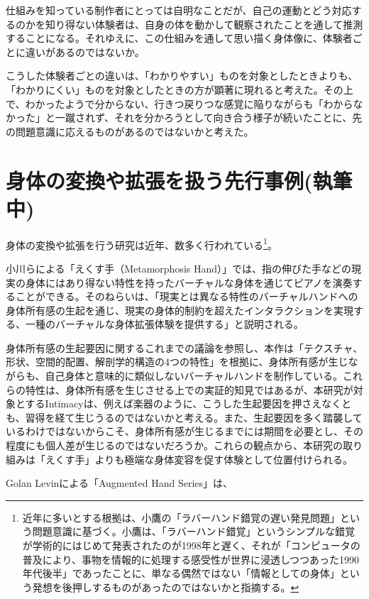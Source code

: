 仕組みを知っている制作者にとっては自明なことだが、自己の運動とどう対応するのかを知り得ない体験者は、自身の体を動かして観察されたことを通して推測することになる。それゆえに、この仕組みを通して思い描く身体像に、体験者ごとに違いがあるのではないか。

こうした体験者ごとの違いは、「わかりやすい」ものを対象としたときよりも、「わかりにくい」ものを対象としたときの方が顕著に現れると考えた。その上で、わかったようで分からない、行きつ戻りつな感覚に陥りながらも「わからなかった」と一蹴されず、それを分かろうとして向き合う様子が続いたことに、先の問題意識に応えるものがあるのではないかと考えた。

\section{身体の変換や拡張を扱う先行事例(執筆中)}
身体の変換や拡張を行う研究は近年、数多く行われている\footnote{近年に多いとする根拠は、小鷹の「ラバーハンド錯覚の遅い発見問題」という問題意識に基づく。小鷹は、「ラバーハンド錯覚」というシンプルな錯覚が学術的にはじめて発表されたのが1998年と遅く、それが「コンピュータの普及により、事物を情報的に処理する感受性が世界に浸透しつつあった1990年代後半」であったことに、単なる偶然ではない「情報としての身体」という発想を後押しするものがあったのではないかと指摘する\cite{kodaka}。}\cite{Kondo2020, ekusute,Kasahara2017,augmented_hand_series}。

小川らによる「えくす手（Metamorphosis Hand）」\cite{ekusute}では、指の伸びた手などの現実の身体にはあり得ない特性を持ったバーチャルな身体を通じてピアノを演奏することができる。そのねらいは、「現実とは異なる特性のバーチャルハンドへの身体所有感の生起を通じ、現実の身体的制約を超えたインタラクションを実現する、一種のバーチャルな身体拡張体験を提供する」と説明される。

身体所有感の生起要因に関するこれまでの議論を参照し、本作は「テクスチャ、形状、空間的配置、解剖学的構造の4つの特性」を根拠に、身体所有感が生じながらも、自己身体と意味的に類似しないバーチャルハンドを制作している。これらの特性は、身体所有感を生じさせる上での実証的知見ではあるが、本研究が対象とするIntimacyは、例えば楽器のように、こうした生起要因を押さえなくとも、習得を経て生じうるのではないかと考える。また、生起要因を多く踏襲しているわけではないからこそ、身体所有感が生じるまでには期間を必要とし、その程度にも個人差が生じるのではないだろうか。これらの観点から、本研究の取り組みは「えくす手」よりも極端な身体変容を促す体験として位置付けられる。

Golan Levinによる「Augmented Hand Series」\cite{augmented_hand_series}は、

